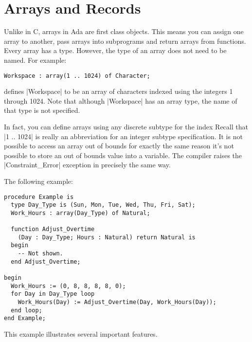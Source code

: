 \section{Arrays and Records}

Unlike in C, arrays in Ada are first class objects. This means you can assign one array to
another, pass arrays into subprograms and return arrays from functions. Every array has a type.
However, the type of an array does not need to be named. For example:

\begin{lstlisting}
Workspace : array(1 .. 1024) of Character;
\end{lstlisting}

\noindent defines |Workspace| to be an array of characters indexed using the integers 1 through
1024. Note that although |Workspace| has an array type, the name of that type is not specified.

In fact, you can define arrays using any discrete subtype for the index Recall that |1 .. 1024|
is really an abbreviation for an integer subtype specification. It is not possible to access an
array out of bounds for exactly the same reason it's not possible to store an out of bounds
value into a variable. The compiler raises the |Constraint_Error| exception in precisely the
same way.

The following example:

\begin{lstlisting}
procedure Example is
  type Day_Type is (Sun, Mon, Tue, Wed, Thu, Fri, Sat);
  Work_Hours : array(Day_Type) of Natural;

  function Adjust_Overtime
    (Day : Day_Type; Hours : Natural) return Natural is
  begin
    -- Not shown.
  end Adjust_Overtime;

begin
  Work_Hours := (0, 8, 8, 8, 8, 0);
  for Day in Day_Type loop
    Work_Hours(Day) := Adjust_Overtime(Day, Work_Hours(Day));
  end loop;
end Example;
\end{lstlisting}

This example illustrates several important features.

